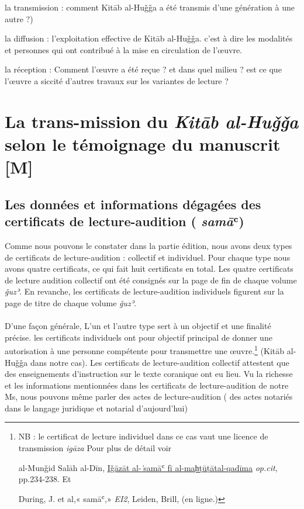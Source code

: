 \documentclass[a4paper,12pt]{report}
\begin{document}
\begin{itemize}
\begin{enumerate}
la transmission : comment Kitāb al-Huǧǧa a été transmis d'une génération à une autre ?)  

la diffusion : l’exploitation effective de  Kitāb al-Huǧǧa. c'est à dire les modalités et personnes qui ont contribué à la mise en circulation de l'œuvre.

la réception : Comment l'œuvre a été reçue ?  et dans quel milieu ? est ce que l'œuvre a siccité  d'autres travaux  sur les variantes de lecture ? 


\section{La trans-mission du \textit{Kitāb  al-Huǧǧa} selon le  témoignage du manuscrit [M] }


\subsection{	Les données et informations dégagées des   certificats de lecture-audition ( \textit{samā}ʿ)  }


Comme nous pouvons le constater dans la partie édition, nous avons deux  types de certificats de lecture-audition :  collectif et individuel. Pour chaque type nous avons quatre certificats, ce qui fait huit certificats en total. Les  quatre certificats de lecture audition collectif  ont été consignés sur  la page de fin de chaque volume \textit{ǧuzʾ}.  En revanche, les certificats de lecture-audition individuels  figurent sur la page de titre de chaque volume \textit{ǧuzʾ}.  

\paragraph{}
D'une façon générale,  L'un et l'autre type sert à un objectif et une finalité précise.   les certificats individuels ont pour objectif principal de donner une autorisation à une personne compétente pour  transmettre une œuvre.\footnote{NB : le certificat de lecture individuel dans ce cas vaut une licence de transmission \textit{igāza} Pour plus de détail voir 
 

al-Munǧid Salāh al-Dīn,  \underline{ Iǧāzāt al- ͗samāʿ   fī al-maḫ̬ṭūṭātal-qadīma} \textit{op.cit}, pp.234-238. Et

During, J. et al,« sam\=aʿ,» \textit{ EI2}, Leiden, Brill, (en ligne.) 
} (Kitāb  al-Huǧǧa dans notre cas).  Les certificats  de lecture-audition collectif attestent que des enseignements d'instruction sur le texte coranique ont eu lieu. Vu la richesse et les informations mentionnées dans  les certificats de lecture-audition de notre Ms, nous pouvons même parler des actes de lecture-audition ( des actes notariés dans le langage juridique et notarial d'aujourd'hui)


\end{enumerate}
\end{itemize}
\end{document}
